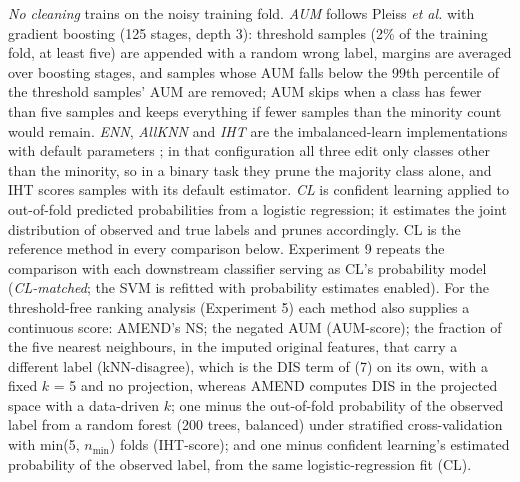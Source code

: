 \documentclass[conference]{IEEEtran}
\begin{document}
\emph{No cleaning} trains on the noisy training fold. \emph{AUM} follows Pleiss \emph{et al.} \cite{pleiss2020} with gradient boosting (125 stages, depth 3): threshold samples (2\% of the training fold, at least five) are appended with a random wrong label, margins are averaged over boosting stages, and samples whose AUM falls below the 99th percentile of the threshold samples' AUM are removed; AUM skips when a class has fewer than five samples and keeps everything if fewer samples than the minority count would remain. \emph{ENN}, \emph{AllKNN} and \emph{IHT} are the imbalanced-learn implementations with default parameters \cite{lemaitre2017}; in that configuration all three edit only classes other than the minority, so in a binary task they prune the majority class alone, and IHT scores samples with its default estimator. \emph{CL} is confident learning \cite{northcutt2021confident} applied to out-of-fold predicted probabilities from a logistic regression; it estimates the joint distribution of observed and true labels and prunes accordingly. CL is the reference method in every comparison below. Experiment 9 repeats the comparison with each downstream classifier serving as CL's probability model (\emph{CL-matched}; the SVM is refitted with probability estimates enabled). For the threshold-free ranking analysis (Experiment 5) each method also supplies a continuous score: AMEND's NS; the negated AUM (AUM-score); the fraction of the five nearest neighbours, in the imputed original features, that carry a different label (kNN-disagree), which is the DIS term of (7) on its own, with a fixed $k$ = 5 and no projection, whereas AMEND computes DIS in the projected space with a data-driven $k$; one minus the out-of-fold probability of the observed label from a random forest (200 trees, balanced) under stratified cross-validation with min(5, $n_{\mathrm{min}}$) folds (IHT-score); and one minus confident learning's estimated probability of the observed label, from the same logistic-regression fit (CL).
\end{document}
